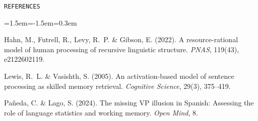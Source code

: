 \documentclass[11pt,a4paper]{article}
\newcommand{\smallcapshead}[1]{{\color{accent}\small\texttt{\MakeUppercase{#1}}}\par\vspace{2pt}{\color{muted}\hrule}\vspace{8pt}}
\begin{document}
\vspace{14pt}
\smallcapshead{References}

{\small
\begin{list}{}{\leftmargin=1.5em\itemindent=-1.5em\itemsep=0.3em\parsep=0pt}
  \item Hahn, M., Futrell, R., Levy, R.~P. \& Gibson, E. (2022). A resource-rational model of human processing of recursive linguistic structure. \textit{PNAS}, 119(43), e2122602119.
  \item Lewis, R.~L. \& Vasishth, S. (2005). An activation-based model of sentence processing as skilled memory retrieval. \textit{Cognitive Science}, 29(3), 375--419.
  \item Pañeda, C. \& Lago, S. (2024). The missing VP illusion in Spanish: Assessing the role of language statistics and working memory. \textit{Open Mind}, 8.
\end{list}
\par}
\end{document}
